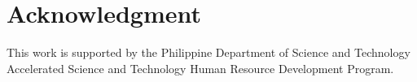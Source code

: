 


\section*{Acknowledgment}
This work is supported by the Philippine Department of Science and Technology Accelerated Science and Technology Human Resource Development Program.




